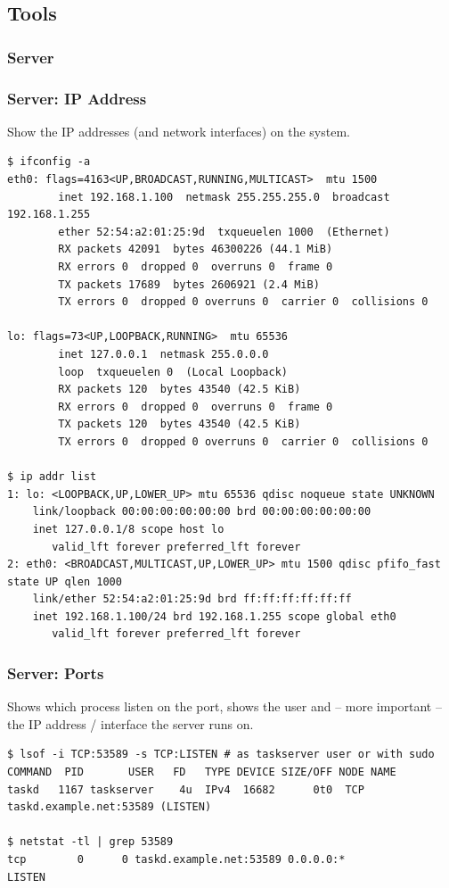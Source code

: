 \documentclass[t,handout]{beamer}
\begin{document}
\subsection{Tools}

\subsubsection{Server}

\begin{frame}[fragile]\frametitle{Server: IP Address}\label{S1}
    \vfill
    Show the IP addresses (and network interfaces) on the system.
    \begin{lstlisting}
$ ifconfig -a
eth0: flags=4163<UP,BROADCAST,RUNNING,MULTICAST>  mtu 1500
        inet 192.168.1.100  netmask 255.255.255.0  broadcast 192.168.1.255
        ether 52:54:a2:01:25:9d  txqueuelen 1000  (Ethernet)
        RX packets 42091  bytes 46300226 (44.1 MiB)
        RX errors 0  dropped 0  overruns 0  frame 0
        TX packets 17689  bytes 2606921 (2.4 MiB)
        TX errors 0  dropped 0 overruns 0  carrier 0  collisions 0

lo: flags=73<UP,LOOPBACK,RUNNING>  mtu 65536
        inet 127.0.0.1  netmask 255.0.0.0
        loop  txqueuelen 0  (Local Loopback)
        RX packets 120  bytes 43540 (42.5 KiB)
        RX errors 0  dropped 0  overruns 0  frame 0
        TX packets 120  bytes 43540 (42.5 KiB)
        TX errors 0  dropped 0 overruns 0  carrier 0  collisions 0

$ ip addr list
1: lo: <LOOPBACK,UP,LOWER_UP> mtu 65536 qdisc noqueue state UNKNOWN
    link/loopback 00:00:00:00:00:00 brd 00:00:00:00:00:00
    inet 127.0.0.1/8 scope host lo
       valid_lft forever preferred_lft forever
2: eth0: <BROADCAST,MULTICAST,UP,LOWER_UP> mtu 1500 qdisc pfifo_fast state UP qlen 1000
    link/ether 52:54:a2:01:25:9d brd ff:ff:ff:ff:ff:ff
    inet 192.168.1.100/24 brd 192.168.1.255 scope global eth0
       valid_lft forever preferred_lft forever\end{lstlisting}
\end{frame}

\begin{frame}[fragile]\frametitle{Server: Ports}\label{S2}
    \vfill
    Shows which process listen on the port, shows the user and -- more important -- the IP address / interface the server runs on.
    \begin{lstlisting}
$ lsof -i TCP:53589 -s TCP:LISTEN # as taskserver user or with sudo
COMMAND  PID       USER   FD   TYPE DEVICE SIZE/OFF NODE NAME
taskd   1167 taskserver    4u  IPv4  16682      0t0  TCP taskd.example.net:53589 (LISTEN)

$ netstat -tl | grep 53589
tcp        0      0 taskd.example.net:53589 0.0.0.0:*               LISTEN\end{lstlisting}
\end{frame}
\end{document}
